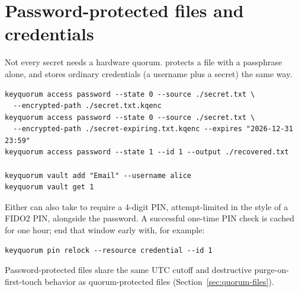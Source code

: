 \section{Password-protected files and credentials}

Not every secret needs a hardware quorum.  protects a
file with a passphrase alone, and  stores ordinary credentials
(a username plus a secret) the same way.

\begin{lstlisting}
keyquorum access password --state 0 --source ./secret.txt \
  --encrypted-path ./secret.txt.kqenc
keyquorum access password --state 0 --source ./secret.txt \
  --encrypted-path ./secret-expiring.txt.kqenc --expires "2026-12-31 23:59"
keyquorum access password --state 1 --id 1 --output ./recovered.txt

keyquorum vault add "Email" --username alice
keyquorum vault get 1
\end{lstlisting}

Either can also take  to require a 4-digit PIN, attempt-limited
in the style of a FIDO2 PIN, alongside the password. A successful one-time
PIN check is cached for one hour; end that window early with, for example:

\begin{lstlisting}
keyquorum pin relock --resource credential --id 1
\end{lstlisting}

\begin{noteBox}
Password-protected files share the same UTC  cutoff and
destructive purge-on-first-touch behavior as quorum-protected files
(Section~\ref{sec:quorum-files}).
\end{noteBox}

